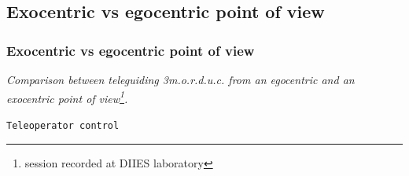 \subsection{Exocentric vs egocentric point of view}
\frame
{
  \frametitle{Exocentric vs egocentric point of view}
  
  \emph{Comparison between teleguiding \textit{3m.o.r.d.u.c.}
    from an egocentric and an exocentric point of view\footnote{\tiny{session recorded at DIIES laboratory}}.}
  \pause

  \begin{block} {\alert{\texttt{Teleoperator control}}}

    \vskip5pt
    
    
    
    \vskip5pt


\end{block}}
